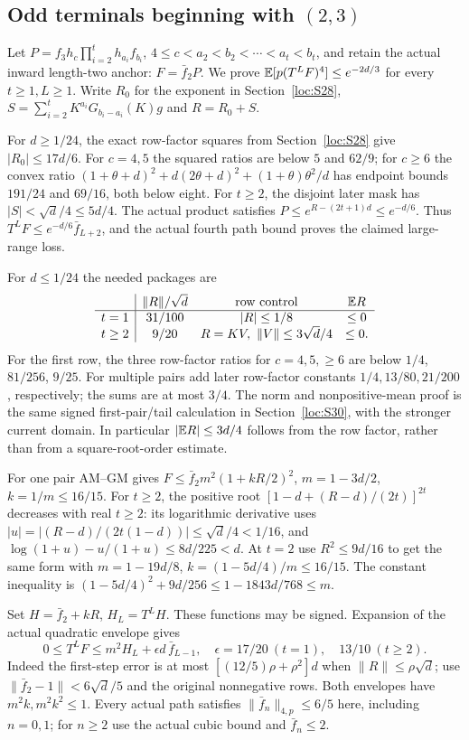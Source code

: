 \subsection[Odd terminals beginning with (2,3)]{Odd terminals beginning with $(2,3)$}\label{loc:S34}
Let $P=f_3h_c\prod_{i=2}^th_{a_i}f_{b_i}$,
$4\le c<a_2<b_2<\cdots<a_t<b_t$, and retain the actual inward
length-two anchor: $F=\bar f_2P$.
We prove $\mathbb E[p(T^LF)^4]\le e^{-2d/3}$ for every $t\ge1,L\ge1$.
Write $R_0$ for the exponent in Section~\ref{loc:S28},
$S=\sum_{i=2}^tK^{a_i}G_{b_i-a_i}(K)g$ and $R=R_0+S$.

For $d\ge1/24$, the exact row-factor squares from
Section~\ref{loc:S28} give $|R_0|\le17d/6$.
For $c=4,5$ the squared ratios are below $5$ and $62/9$;
for $c\ge6$ the convex ratio
$(1+\theta+d)^2+d(2\theta+d)^2+(1+\theta)\theta^2/d$
has endpoint bounds $191/24$ and $69/16$, both below eight.
For $t\ge2$, the disjoint later mask has $|S|<\sqrt d/4\le5d/4$.
The actual product satisfies $P\le e^{R-(2t+1)d}\le e^{-d/6}$.
Thus $T^LF\le e^{-d/6}\bar f_{L+2}$, and the actual fourth path bound
proves the claimed large-range loss.

For $d\le1/24$ the needed packages are
\[
 \begin{array}{c|ccc}
 &\|R\|/\sqrt d&\text{row control}&\mathbb E R\\\hline
 t=1&31/100&|R|\le1/8&\le0\\
 t\ge2&9/20&R=KV,\ \|V\|\le3\sqrt d/4&\le0.
 \end{array}
\]
For the first row, the three row-factor ratios for $c=4,5,\ge6$
are below $1/4$, $81/256$, $9/25$.
For multiple pairs add later row-factor constants
$1/4,13/80,21/200$, respectively; the sums are at most $3/4$.
The norm and nonpositive-mean proof is the same signed first-pair/tail
calculation in Section~\ref{loc:S30}, with the stronger current domain.
In particular $|\mathbb E R|\le3d/4$ follows from the row factor,
rather than from a square-root-order estimate.

For one pair AM--GM gives
$F\le \bar f_2m^2(1+kR/2)^2$, $m=1-3d/2$, $k=1/m\le16/15$.
For $t\ge2$, the positive root
$[1-d+(R-d)/(2t)]^{2t}$ decreases with real $t\ge2$:
its logarithmic derivative uses
$|u|=|(R-d)/(2t(1-d))|\le\sqrt d/4<1/16$,
and $\log(1+u)-u/(1+u)\le8d/225<d$.
At $t=2$ use $R^2\le9d/16$ to get the same form with
$m=1-19d/8$, $k=(1-5d/4)/m\le16/15$.
The constant inequality is
$(1-5d/4)^2+9d/256\le1-1843d/768\le m$.

Set $H=\bar f_2+kR$, $H_L=T^LH$. These functions may be signed.
Expansion of the actual quadratic envelope gives
\begin{equation}\label{eq:compact-odd23-row}
 0\le T^LF\le m^2H_L+\epsilon d\,\bar f_{L-1},\quad
 \epsilon=17/20\ (t=1),\quad13/10\ (t\ge2).
\end{equation}
Indeed the first-step error is at most
$[(12/5)\rho+\rho^2]d$ when $\|R\|\le\rho\sqrt d$;
use $\|\bar f_2-1\|<6\sqrt d/5$ and the original nonnegative rows.
Both envelopes have $m^2k,m^2k^2\le1$.
Every actual path satisfies $\|\bar f_{n}\|_{4,p}\le6/5$ here, including
$n=0,1$; for $n\ge2$ use the actual cubic bound and $\bar f_{n}\le2$.


